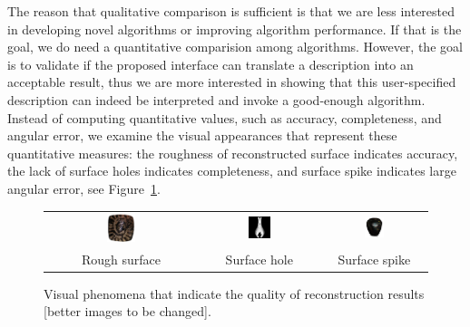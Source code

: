 The reason that qualitative comparison is sufficient is that we are less interested in developing novel algorithms or improving algorithm performance. If that is the goal, we do need a quantitative comparision among algorithms. However, the goal is to validate if the proposed interface can translate a description into an acceptable result, thus we are more interested in showing that this user-specified description can indeed be interpreted and invoke a good-enough algorithm. Instead of computing quantitative values, such as accuracy, completeness, and angular error, we examine the visual appearances that represent these quantitative measures: the roughness of reconstructed surface indicates accuracy, the lack of surface holes indicates completeness, and surface spike indicates large angular error, see Figure~\ref{fig:vis_quality}.
\begin{figure}[!htbp]
\centering
\begin{tabular}{ccc}
\includegraphics[width=0.2\textwidth]{img/interp/real_interp/pot/pot_sc} &
\includegraphics[width=0.2\textwidth]{img/interp/synth_interp/vase0_sl} &
\includegraphics[width=0.2\textwidth]{img/interp/real_interp/vase/vase_ps} \\
Rough surface & Surface hole & Surface spike\\
\end{tabular}
\caption{Visual phenomena that indicate the quality of reconstruction results [better images to be changed].}
\label{fig:vis_quality}
\end{figure}


